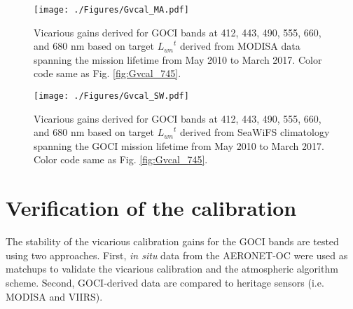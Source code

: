 \documentclass[10pt]{article}
\begin{document}
\begin{figure}[H]
  \centering
  \texttt{[image: ./Figures/Gvcal\_MA.pdf]}
    \caption{Vicarious gains derived for GOCI bands at 412, 443, 490, 555, 660, and 680 nm based on target ${L_{wn}}^t$ derived from MODISA data spanning the mission lifetime from May 2010 to March 2017. Color code same as Fig. \ref{fig:Gvcal_745}.  \label{fig:Gvcal_MA}} 
\end{figure}
\begin{figure}[H]
  \centering
  \texttt{[image: ./Figures/Gvcal\_SW.pdf]}
    \caption{Vicarious gains derived for GOCI bands at 412, 443, 490, 555, 660, and 680 nm based on target ${L_{wn}}^t$ derived from SeaWiFS climatology spanning the GOCI mission lifetime from May 2010 to March 2017.  Color code same as Fig. \ref{fig:Gvcal_745}.  \label{fig:Gvcal_SW}} 
\end{figure}








\section{Verification of the calibration}
The stability of the vicarious calibration gains for the GOCI bands are tested using two approaches. First, {\it in situ} data from the AERONET-OC were used as matchups to validate the vicarious calibration and the atmospheric algorithm scheme. Second, GOCI-derived data are compared to heritage sensors (i.e. MODISA and VIIRS). 
\end{document}

